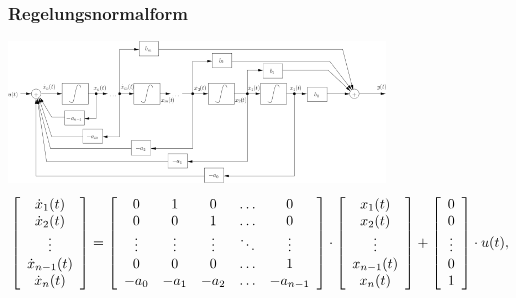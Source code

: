 \subsubsection{Regelungsnormalform }
\includegraphics[width=10cm]{./images/zrd-regelungsnormalform.png} \\
\scriptsize
\begin{equation*}
\left [ 
\begin{array}{c}
\dot{x}_1(t)\\
\dot{x}_2(t)\\
\vdots\\
\dot{x}_{n-1}(t)\\
\dot{x}_{n}(t)\\
\end{array}
\right ] =
\left [ 
\begin{array}{c c c c c}
0 & 1 & 0 & \ldots & 0\\
0 & 0 & 1 & \ldots & 0\\
\vdots & \vdots & \vdots & \ddots & \vdots\\
0 & 0 & 0 & \ldots & 1\\
-a_0 & -a_1 & -a_2 & \ldots & -a_{n-1}\\
\end{array}
\right ]\cdot
\left [ 
\begin{array}{c}
x_1(t)\\
x_2(t)\\
\vdots \\
x_{n-1}(t)\\
x_{n}(t)\\
\end{array}
\right ]+
\left [ 
\begin{array}{c}
0 \\
0\\
\vdots\\
0\\
1\\
\end{array}
\right ]\cdot
u(t),
\end{equation*}
